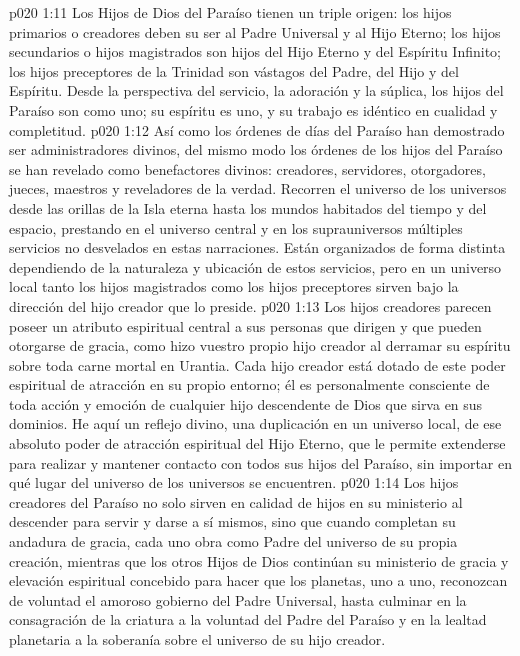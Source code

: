 \vs p020 1:11 \pc Los Hijos de Dios del Paraíso tienen un triple origen: los hijos primarios o creadores deben su ser al Padre Universal y al Hijo Eterno; los hijos secundarios o hijos magistrados son hijos del Hijo Eterno y del Espíritu Infinito; los hijos preceptores de la Trinidad son vástagos del Padre, del Hijo y del Espíritu. Desde la perspectiva del servicio, la adoración y la súplica, los hijos del Paraíso son como uno; su espíritu es uno, y su trabajo es idéntico en cualidad y completitud.
\vs p020 1:12 Así como los órdenes de días del Paraíso han demostrado ser administradores divinos, del mismo modo los órdenes de los hijos del Paraíso se han revelado como benefactores divinos: creadores, servidores, otorgadores, jueces, maestros y reveladores de la verdad. Recorren el universo de los universos desde las orillas de la Isla eterna hasta los mundos habitados del tiempo y del espacio, prestando en el universo central y en los suprauniversos múltiples servicios no desvelados en estas narraciones. Están organizados de forma distinta dependiendo de la naturaleza y ubicación de estos servicios, pero en un universo local tanto los hijos magistrados como los hijos preceptores sirven bajo la dirección del hijo creador que lo preside.
\vs p020 1:13 Los hijos creadores parecen poseer un atributo espiritual central a sus personas que dirigen y que pueden otorgarse de gracia, como hizo vuestro propio hijo creador al derramar su espíritu sobre toda carne mortal en Urantia. Cada hijo creador está dotado de este poder espiritual de atracción en su propio entorno; él es personalmente consciente de toda acción y emoción de cualquier hijo descendente de Dios que sirva en sus dominios. He aquí un reflejo divino, una duplicación en un universo local, de ese absoluto poder de atracción espiritual del Hijo Eterno, que le permite extenderse para realizar y mantener contacto con todos sus hijos del Paraíso, sin importar en qué lugar del universo de los universos se encuentren.
\vs p020 1:14 Los hijos creadores del Paraíso no solo sirven en calidad de hijos en su ministerio al descender para servir y darse a sí mismos, sino que cuando completan su andadura de gracia, cada uno obra como Padre del universo de su propia creación, mientras que los otros Hijos de Dios continúan su ministerio de gracia y elevación espiritual concebido para hacer que los planetas, uno a uno, reconozcan de voluntad el amoroso gobierno del Padre Universal, hasta culminar en la consagración de la criatura a la voluntad del Padre del Paraíso y en la lealtad planetaria a la soberanía sobre el universo de su hijo creador.
